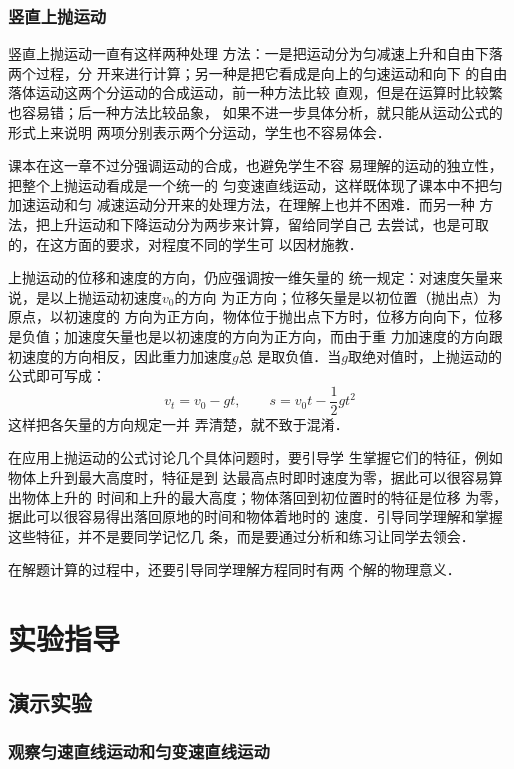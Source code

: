 \subsubsection{竖直上抛运动}

竖直上抛运动一直有这样两种处理
方法：一是把运动分为匀减速上升和自由下落两个过程，分
开来进行计算；另一种是把它看成是向上的匀速运动和向下
的自由落体运动这两个分运动的合成运动，前一种方法比较
直观，但是在运算时比较繁也容易错；后一种方法比较品象，
如果不进一步具体分析，就只能从运动公式的形式上来说明
两项分别表示两个分运动，学生也不容易体会．

课本在这一章不过分强调运动的合成，也避免学生不容
易理解的运动的独立性，把整个上抛运动看成是一个统一的
匀变速直线运动，这样既体现了课本中不把匀加速运动和匀
减速运动分开来的处理方法，在理解上也并不困难．而另一种
方法，把上升运动和下降运动分为两步来计算，留给同学自己
去尝试，也是可取的，在这方面的要求，对程度不同的学生可
以因材施教．

上抛运动的位移和速度的方向，仍应强调按一维矢量的
统一规定：对速度矢量来说，是以上抛运动初速度$v_0$的方向
为正方向；位移矢量是以初位置（抛出点）为原点，以初速度的
方向为正方向，物体位于抛出点下方时，位移方向向下，位移
是负值；加速度矢量也是以初速度的方向为正方向，而由于重
力加速度的方向跟初速度的方向相反，因此重力加速度$g$总
是取负值．当$g$取绝对值时，上抛运动的公式即可写成：
\[v_t=v_0-gt,\qquad s=v_0t-\frac{1}{2}gt^2\]
这样把各矢量的方向规定一并
弄清楚，就不致于混淆．

在应用上抛运动的公式讨论几个具体问题时，要引导学
生掌握它们的特征，例如物体上升到最大高度时，特征是到
达最高点时即时速度为零，据此可以很容易算出物体上升的
时间和上升的最大高度；物体落回到初位置时的特征是位移
为零，据此可以很容易得出落回原地的时间和物体着地时的
速度．引导同学理解和掌握这些特征，并不是要同学记忆几
条，而是要通过分析和练习让同学去领会．

在解题计算的过程中，还要引导同学理解方程同时有两
个解的物理意义．

\section{实验指导}
\subsection{演示实验}
\subsubsection{观察匀速直线运动和匀变速直线运动}

